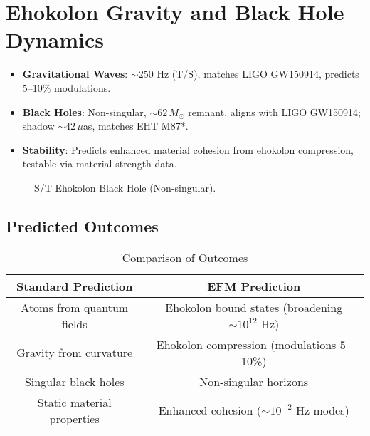 \documentclass{article}
\begin{document}
\section{Ehokolon Gravity and Black Hole Dynamics}
\begin{itemize}
    \item \textbf{Gravitational Waves}: $\sim 250$ Hz (T/S), matches LIGO GW150914, predicts 5–10\% modulations.
    \item \textbf{Black Holes}: Non-singular, $\sim 62 \, M_\odot$ remnant, aligns with LIGO GW150914; shadow $\sim 42 \, \mu$as, matches EHT M87*.
    \item \textbf{Stability}: Predicts enhanced material cohesion from ehokolon compression, testable via material strength data.
\end{itemize}

\begin{figure}[ht]
    \centering
    \caption{S/T Ehokolon Black Hole (Non-singular).}
    \label{fig:kerr}
\end{figure}

\subsection{Predicted Outcomes}
\begin{table}[h]
    \centering
    \begin{tabular}{|c|c|}
        \hline
        \textbf{Standard Prediction} & \textbf{EFM Prediction} \\
        \hline
        Atoms from quantum fields & Ehokolon bound states (broadening $\sim 10^{12}$ Hz) \\
        Gravity from curvature & Ehokolon compression (modulations 5–10\%) \\
        Singular black holes & Non-singular horizons \\
        Static material properties & Enhanced cohesion ($\sim 10^{-2}$ Hz modes) \\
        \hline
    \end{tabular}
    \caption{Comparison of Outcomes}
    \label{tab:predictions}
\end{table}
\end{document}
